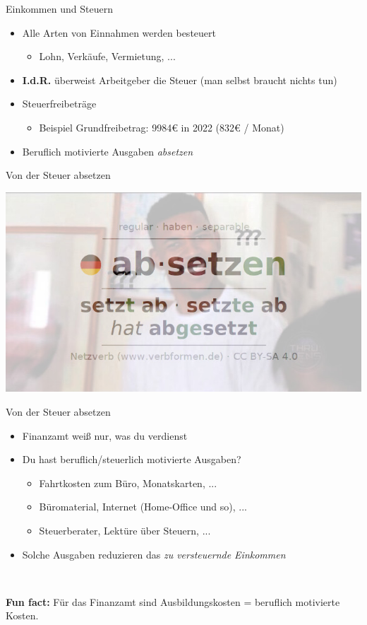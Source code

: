 \documentclass[draft]{beamer}
\newcommand{\n}{\hfill\\\vspace{0.25cm}}
\begin{document}
			\begin{frame}{Einkommen und Steuern}
				\begin{itemize}
					\item Alle Arten von Einnahmen werden besteuert
					\begin{itemize}
						\item Lohn, Verkäufe, Vermietung, ...
					\end{itemize}
					\item \textbf{I.d.R.} überweist Arbeitgeber die Steuer (man selbst braucht nichts tun)
					\item Steuerfreibeträge
					\begin{itemize}
						\item Beispiel Grundfreibetrag: 9984€ in 2022 (832€ / Monat)
					\end{itemize}
					\item Beruflich motivierte Ausgaben \textit{absetzen}
				\end{itemize}
			\end{frame}
		
			\begin{frame}{Von der Steuer absetzen}
				\begin{center}
					\includegraphics[width=0.75\linewidth]{images/absetzen}
				\end{center}
			\end{frame}
		
			\begin{frame}{Von der Steuer absetzen}
				\begin{itemize}
					\item Finanzamt weiß nur, was du verdienst
					\item Du hast beruflich/steuerlich motivierte Ausgaben?
					\begin{itemize}
						\item Fahrtkosten zum Büro, Monatskarten, ...
						\item Büromaterial, Internet (Home-Office und so), ...
						\item Steuerberater, Lektüre über Steuern, ...
					\end{itemize}
					\item Solche Ausgaben reduzieren das \textit{zu versteuernde Einkommen}
				\end{itemize}\n\pause
				
				\textbf{Fun fact:} Für das Finanzamt sind Ausbildungskosten = beruflich motivierte Kosten.
			\end{frame}
				
\end{document}

